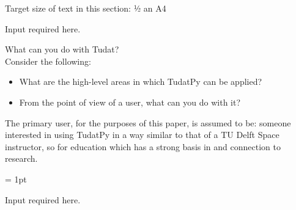 \lbrack Target size of text in this section: ½ an A4\rbrack

\lbrack Input required here.\rbrack

What can you do with Tudat? \\
Consider the following:
\begin{itemize}
    \item What are the high-level areas in which TudatPy can be applied? 
    \item From the point of view of a user, what can you do with it?
\end{itemize}
    
The primary user, for the purposes of this paper, is assumed to be: someone interested in using TudatPy in a way similar to that of a TU Delft Space instructor, so for education which has a strong basis in and connection to research.

\fboxrule = 1pt

\lbrack Input required here.\rbrack
